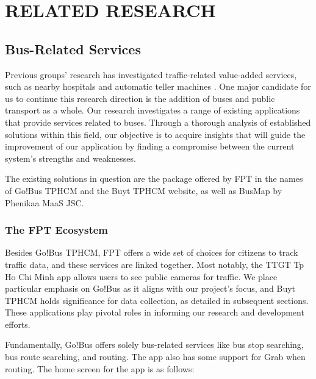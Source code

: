 %
%
\section{RELATED RESEARCH}
\label{section:related_research}

\subsection{Bus-Related Services}

Previous groups' research has investigated traffic-related value-added services, such as nearby hospitals and automatic teller machines \cite{added_services}. One major candidate for us to continue this research direction is the addition of buses and public transport as a whole. Our research investigates a range of existing applications that provide services related to buses. Through a thorough analysis of established solutions within this field, our objective is to acquire insights that will guide the improvement of our application by finding a compromise between the current system's strengths and weaknesses.

The existing solutions in question are the package offered by FPT in the names of Go!Bus TPHCM and the Buyt TPHCM website, as well as BusMap by Phenikaa MaaS JSC.
\subsubsection{The FPT Ecosystem}

Besides Go!Bus TPHCM, FPT offers a wide set of choices for citizens to track traﬀic data, and these services are linked together. Most notably, the TTGT Tp Ho Chi Minh app allows users to see public cameras for traﬀic. We place particular emphasis on Go!Bus as it aligns with our project's focus, and Buyt TPHCM holds significance for data collection, as detailed in subsequent sections. These applications play pivotal roles in informing our research and development efforts.


Fundamentally, Go!Bus offers solely bus-related services like bus stop searching, bus route searching, and routing. The app also has some support for Grab when routing. The home screen for the app is as follows:

